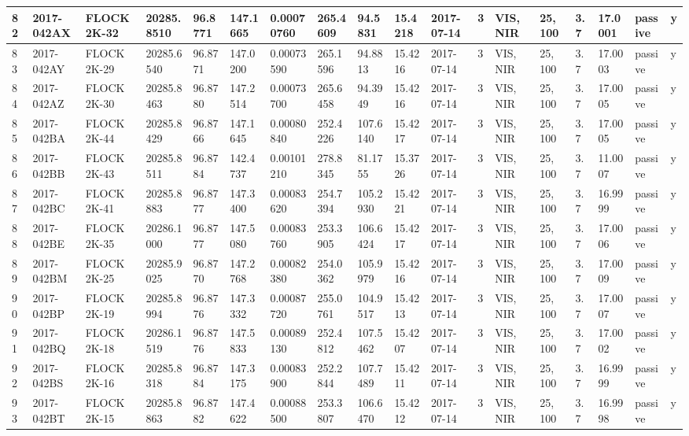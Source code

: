 \documentclass[12pt,a4paper,notitlepage,twoside,openright]{report}
\begin{document}
\begin{longtable}{|l|l|l|l|l|l|l|l|l|l|l|l|l|l|l|l|l|l|}
        82 & 2017-042AX & FLOCK 2K-32 & 20285.8510 & 96.8771 & 147.1665 & 0.00070760 & 265.4609 & 94.5831 & 15.4218 & 2017-07-14 & 3 & VIS, NIR & 25, 100 & 3.7 & 17.0001 & passive & y \\ \hline
        83 & 2017-042AY & FLOCK 2K-29 & 20285.6540 & 96.8771 & 147.0200 & 0.00073590 & 265.1596 & 94.8813 & 15.4216 & 2017-07-14 & 3 & VIS, NIR & 25, 100 & 3.7 & 17.0003 & passive & y \\ \hline
        84 & 2017-042AZ & FLOCK 2K-30 & 20285.8463 & 96.8780 & 147.2514 & 0.00073700 & 265.6458 & 94.3949 & 15.4216 & 2017-07-14 & 3 & VIS, NIR & 25, 100 & 3.7 & 17.0005 & passive & y \\ \hline
        85 & 2017-042BA & FLOCK 2K-44 & 20285.8429 & 96.8766 & 147.1645 & 0.00080840 & 252.4226 & 107.6140 & 15.4217 & 2017-07-14 & 3 & VIS, NIR & 25, 100 & 3.7 & 17.0005 & passive & y \\ \hline
        86 & 2017-042BB & FLOCK 2K-43 & 20285.8511 & 96.8784 & 142.4737 & 0.00101210 & 278.8345 & 81.1755 & 15.3726 & 2017-07-14 & 3 & VIS, NIR & 25, 100 & 3.7 & 11.0007 & passive & y \\ \hline
        87 & 2017-042BC & FLOCK 2K-41 & 20285.8883 & 96.8777 & 147.3400 & 0.00083620 & 254.7394 & 105.2930 & 15.4221 & 2017-07-14 & 3 & VIS, NIR & 25, 100 & 3.7 & 16.9999 & passive & y \\ \hline
        88 & 2017-042BE & FLOCK 2K-35 & 20286.1000 & 96.8777 & 147.5080 & 0.00083760 & 253.3905 & 106.6424 & 15.4217 & 2017-07-14 & 3 & VIS, NIR & 25, 100 & 3.7 & 17.0006 & passive & y \\ \hline
        89 & 2017-042BM & FLOCK 2K-25 & 20285.9025 & 96.8770 & 147.2768 & 0.00082380 & 254.0362 & 105.9979 & 15.4216 & 2017-07-14 & 3 & VIS, NIR & 25, 100 & 3.7 & 17.0009 & passive & y \\ \hline
        90 & 2017-042BP & FLOCK 2K-19 & 20285.8994 & 96.8776 & 147.3332 & 0.00087720 & 255.0761 & 104.9517 & 15.4213 & 2017-07-14 & 3 & VIS, NIR & 25, 100 & 3.7 & 17.0007 & passive & y \\ \hline
        91 & 2017-042BQ & FLOCK 2K-18 & 20286.1519 & 96.8776 & 147.5833 & 0.00089130 & 252.4812 & 107.5462 & 15.4207 & 2017-07-14 & 3 & VIS, NIR & 25, 100 & 3.7 & 17.0002 & passive & y \\ \hline
        92 & 2017-042BS & FLOCK 2K-16 & 20285.8318 & 96.8784 & 147.3175 & 0.00083900 & 252.2844 & 107.7489 & 15.4211 & 2017-07-14 & 3 & VIS, NIR & 25, 100 & 3.7 & 16.9999 & passive & y \\ \hline
        93 & 2017-042BT & FLOCK 2K-15 & 20285.8863 & 96.8782 & 147.4622 & 0.00088500 & 253.3807 & 106.6470 & 15.4212 & 2017-07-14 & 3 & VIS, NIR & 25, 100 & 3.7 & 16.9998 & passive & y \\ \hline

\end{longtable}
\end{document}
